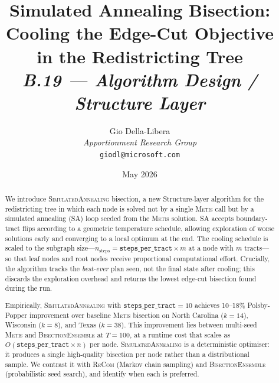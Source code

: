 \documentclass[12pt]{article}
\title{%
  \textbf{Simulated Annealing Bisection: Cooling the Edge-Cut Objective}\\
  \textbf{in the Redistricting Tree}\\[0.8em]
  \normalsize\textit{B.19 --- Algorithm Design / Structure Layer}%
}
\author{%
  Gio Della-Libera\\
  \textit{Apportionment Research Group}\\
  \small\texttt{giodl@microsoft.com}
}
\date{May 2026}
\newcommand{\sa}{\textsc{SimulatedAnnealing}}
\newcommand{\metis}{\textsc{Metis}}
\newcommand{\be}{\textsc{BisectionEnsemble}}
\newcommand{\recom}{\textsc{ReCom}}
\begin{document}
\maketitle

\begin{abstract}
\noindent
We introduce \sa{} bisection, a new Structure-layer algorithm for the
redistricting tree in which each node is solved not by a single
\metis{} call but by a simulated annealing (SA) loop seeded from
the \metis{} solution.
SA accepts boundary-tract flips according to a geometric temperature
schedule, allowing exploration of worse solutions early and converging
to a local optimum at the end.
The cooling schedule is scaled to the subgraph size---$n_{\mathrm{steps}}
= \texttt{steps\_per\_tract} \times m$ at a node with $m$ tracts---so that
leaf nodes and root nodes receive proportional computational effort.
Crucially, the algorithm tracks the \emph{best-ever} plan seen, not
the final state after cooling; this discards the exploration overhead
and returns the lowest edge-cut bisection found during the run.

Empirically, \sa{} with $\texttt{steps\_per\_tract} = 10$ achieves
10--18\% Polsby-Popper improvement over baseline \metis{} bisection
on North Carolina ($k=14$), Wisconsin ($k=8$), and Texas ($k=38$).
This improvement lies between multi-seed \metis{} and \be{} at $T=100$,
at a runtime cost that scales as $O(\texttt{steps\_per\_tract} \times n)$
per node.
\sa{} is a deterministic optimiser: it produces a single high-quality
bisection per node rather than a distributional sample.
We contrast it with \recom{} (Markov chain sampling) and \be{}
(probabilistic seed search), and identify when each is preferred.
\end{abstract}

\tableofcontents
\newpage











\end{document}
